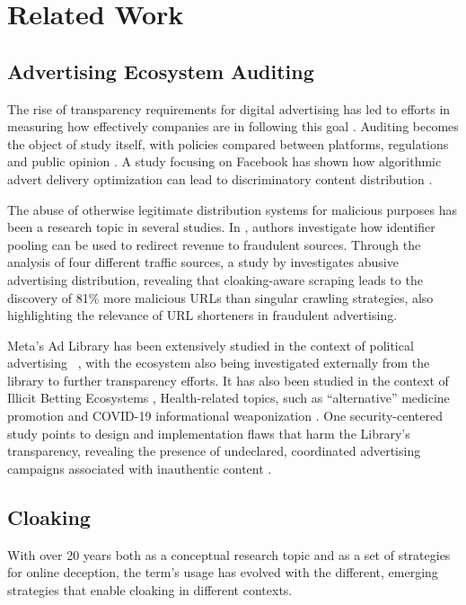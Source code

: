 
\section{Related Work}
\subsection{Advertising Ecosystem Auditing}
The rise of transparency requirements for digital advertising has led to efforts in measuring how effectively companies are in following this goal \cite{metaAudit}. Auditing becomes the object of study itself, with policies compared between platforms, regulations and public opinion \cite{politicalComplexity}. A study focusing on Facebook has shown how algorithmic advert delivery optimization can lead to discriminatory content distribution \cite{adDeliveryDiscrimination}.

The abuse of otherwise legitimate distribution systems for malicious purposes has been a research topic in several studies. In \cite{adFraudRevenue}, authors investigate how identifier pooling can be used to redirect revenue to fraudulent sources. Through the analysis of four different traffic sources, a study by \cite{urlShortAbuse_Cloaking_WWW} investigates abusive advertising distribution, revealing that cloaking-aware scraping leads to the discovery of 81\% more malicious URLs than singular crawling strategies, also highlighting the relevance of URL shorteners in fraudulent advertising. 

Meta's Ad Library has been extensively studied in the context of political advertising ~\cite{adpolit1, adpolit2, adpolit3, adpolit4}, with the ecosystem also being investigated externally \cite{politAuditMetaWWW, transparencyLimitationAdLib} from the library to further transparency efforts. It has also been studied in the context of Illicit Betting Ecosystems \cite{adLibBet}, Health-related topics, such as ``alternative'' medicine promotion \cite{healthMetaAd} and COVID-19 informational weaponization \cite{adLibHealth}. One security-centered study points to design and implementation flaws that harm the Library's transparency, revealing the presence of undeclared, coordinated advertising campaigns associated with inauthentic content \cite{adlibSecAudit}. 

\subsection{Cloaking}
With over 20 years both as a conceptual research topic and as a set of strategies for online deception, the term's usage has evolved with the different, emerging strategies that enable cloaking in different contexts. 


